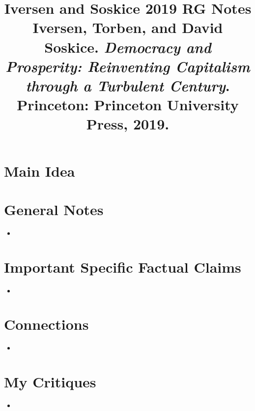 \documentclass[12pt]{article}
\title{\textbf{Iversen and Soskice 2019 RG Notes}\\
\large Iversen, Torben, and David Soskice. \textit{Democracy and Prosperity: Reinventing Capitalism through a Turbulent Century}.\\
Princeton: Princeton University Press, 2019.}
\author{}
\date{}
\begin{document}
\maketitle

\section{Main Idea}



\section{General Notes}

\begin{itemize}[leftmargin=*, itemsep=4pt]
    \item
\end{itemize}


\section{Important Specific Factual Claims}

\begin{itemize}[leftmargin=*, itemsep=4pt]
    \item
\end{itemize}


\section{Connections}

\begin{itemize}
    \item
\end{itemize}


\section{My Critiques}

\begin{itemize}
    \item
\end{itemize}
\end{document}
